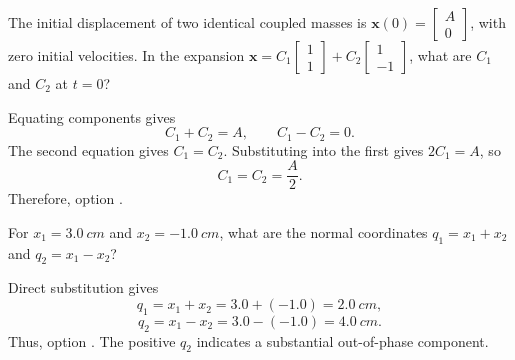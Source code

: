 \begin{quizquestion}[
  id=phy104-nm-028,
  topic=normal-modes,
  difficulty=applied,
  marks=2,
  correct=C,
  tags={normal-coordinates,modal-decomposition,initial-conditions},
  outcome={Decompose an initial displacement into normal modes}
]
  The initial displacement of two identical coupled masses is \(\mathbf{x}(0)=\begin{bmatrix}A\\0\end{bmatrix}\), with zero initial velocities. In the expansion \(\mathbf{x}=C_1\begin{bmatrix}1\\1\end{bmatrix}+C_2\begin{bmatrix}1\\-1\end{bmatrix}\), what are \(C_1\) and \(C_2\) at \(t=0\)?
\end{quizquestion}
\begin{quizsolution}
  Equating components gives
    \[
      C_1+C_2=A,
      \qquad
      C_1-C_2=0.
    \]
    The second equation gives \(C_1=C_2\). Substituting into the first gives \(2C_1=A\), so
    \[
      C_1=C_2=\frac{A}{2}.
    \]
    Therefore, option \textbf{\quizcorrectletter}.
\end{quizsolution}

\begin{quizquestion}[
  id=phy104-nm-029,
  topic=normal-modes,
  difficulty=applied,
  marks=2,
  correct=A,
  tags={normal-coordinates,coordinate-transform},
  outcome={Calculate normal coordinates from physical displacements}
]
  For \(x_1=\SI{3.0}{cm}\) and \(x_2=\SI{-1.0}{cm}\), what are the normal coordinates \(q_1=x_1+x_2\) and \(q_2=x_1-x_2\)?
\end{quizquestion}
\begin{quizsolution}
  Direct substitution gives
    \[
      q_1=x_1+x_2=3.0+(-1.0)=\SI{2.0}{cm},
    \]
    \[
      q_2=x_1-x_2=3.0-(-1.0)=\SI{4.0}{cm}.
    \]
    Thus, option \textbf{\quizcorrectletter}. The positive \(q_2\) indicates a substantial out-of-phase component.
\end{quizsolution}

